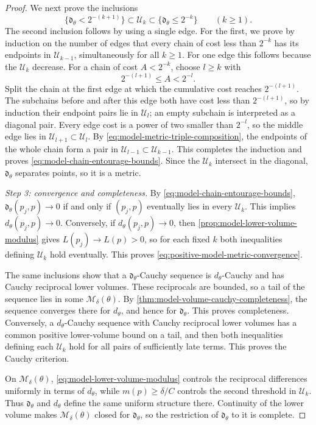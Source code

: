 \begin{proof}
We next prove the inclusions
\begin{equation}\label{eq:model-chain-entourage-bounds}
 \{\mathfrak d_\theta<2^{-(k+1)}\}
 \subset\mathcal U_k\subset\{\mathfrak d_\theta\leq2^{-k}\}
 \qquad(k\geq1).
\end{equation}
The second inclusion follows by using a single edge. For the first, we prove by induction on the number of edges that every chain of cost less than $2^{-k}$ has its endpoints in $\mathcal U_{k-1}$, simultaneously for all $k\geq1$. For one edge this follows because the $\mathcal U_k$ decrease. For a chain of cost $A<2^{-k}$, choose $l\geq k$ with
\[
 2^{-(l+1)}\leq A<2^{-l}.
\]
Split the chain at the first edge at which the cumulative cost reaches $2^{-(l+1)}$. The subchains before and after this edge both have cost less than $2^{-(l+1)}$, so by induction their endpoint pairs lie in $\mathcal U_l$; an empty subchain is interpreted as a diagonal pair. Every edge cost is a power of two smaller than $2^{-l}$, so the middle edge lies in $\mathcal U_{l+1}\subset\mathcal U_l$. By \eqref{eq:model-metric-triple-composition}, the endpoints of the whole chain form a pair in $\mathcal U_{l-1}\subset\mathcal U_{k-1}$. This completes the induction and proves \eqref{eq:model-chain-entourage-bounds}. Since the $\mathcal U_k$ intersect in the diagonal, $\mathfrak d_\theta$ separates points, so it is a metric.

\emph{Step 3: convergence and completeness.} By \eqref{eq:model-chain-entourage-bounds}, $\mathfrak d_\theta(p_j,p)\to0$ if and only if $(p_j,p)$ eventually lies in every $\mathcal U_k$. This implies $d_\theta(p_j,p)\to0$. Conversely, if $d_\theta(p_j,p)\to0$, then \cref{prop:model-lower-volume-modulus} gives $L(p_j)\to L(p)>0$, so for each fixed $k$ both inequalities defining $\mathcal U_k$ hold eventually. This proves \eqref{eq:positive-model-metric-convergence}.

The same inclusions show that a $\mathfrak d_\theta$-Cauchy sequence is $d_\theta$-Cauchy and has Cauchy reciprocal lower volumes. These reciprocals are bounded, so a tail of the sequence lies in some $\mathcal M_\delta(\theta)$. By \cref{thm:model-volume-cauchy-completeness}, the sequence converges there for $d_\theta$, and hence for $\mathfrak d_\theta$. This proves completeness. Conversely, a $d_\theta$-Cauchy sequence with Cauchy reciprocal lower volumes has a common positive lower-volume bound on a tail, and then both inequalities defining each $\mathcal U_k$ hold for all pairs of sufficiently late terms. This proves the Cauchy criterion.

On $\mathcal M_\delta(\theta)$, \eqref{eq:model-lower-volume-modulus} controls the reciprocal differences uniformly in terms of $d_\theta$, while $m(p)\geq\delta/C$ controls the second threshold in $\mathcal U_k$. Thus $\mathfrak d_\theta$ and $d_\theta$ define the same uniform structure there. Continuity of the lower volume makes $\mathcal M_\delta(\theta)$ closed for $\mathfrak d_\theta$, so the restriction of $\mathfrak d_\theta$ to it is complete.
\end{proof}

